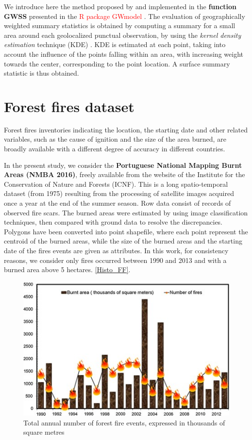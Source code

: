 \documentclass[
]{book}
\begin{document}
We introduce here the method proposed by \citep{brunsdon_geographically_2002} and implemented in the \textbf{function GWSS} presented in the \textcolor{red} {R package GWmodel} \citep{lu_gwmodel_2014, brunsdon_rpubs_2019}.
The evaluation of geographically weighted summary statistics is obtained by computing a summary for a small area around each geolocalized punctual observation, by using the \emph{kernel density estimation} technique (KDE) \citep{brunsdon_estimating_1995}.
KDE is estimated at each point, taking into account the influence of the points falling within an area, with increasing weight towards the center, corresponding to the point location.
A surface summary statistic is thus obtained.

\hypertarget{forest-fires-dataset}{%
\section{Forest fires dataset}\label{forest-fires-dataset}}

Forest fires inventories indicating the location, the starting date and other related variables, such as the cause of ignition and the size of the area burned, are broadly available with a different degree of accuracy in different countries.

In the present study, we consider the \textbf{Portuguese National Mapping Burnt Areas (NMBA 2016)}, freely available from the website of the Institute for the Conservation of Nature and Forests (ICNF).
This is a long spatio-temporal dataset (from 1975) resulting from the processing of satellite images acquired once a year at the end of the summer season.
Row data consist of records of observed fire scars.
The burned areas were estimated by using image classification techniques, then compared with ground data to resolve the discrepancies.
Polygons have been converted into point shapefile, where each point represent the centroid of the burned areas, while the size of the burned areas and the starting date of the fires events are given as attributes.
In this work, for consistency reasons, we consider only fires occurred between 1990 and 2013 and with a burned area above 5 hectares.
\autoref{Histo_FF}.

\begin{figure}

{\centering \includegraphics[width=0.7\linewidth,height=0.7\textheight]{images/Histo_FF} 

}

\caption{Total annual number of forest fire events, expressed in thousands of square metres \label{Histo_FF}}\label{fig:jpg}
\end{figure}
\end{document}
